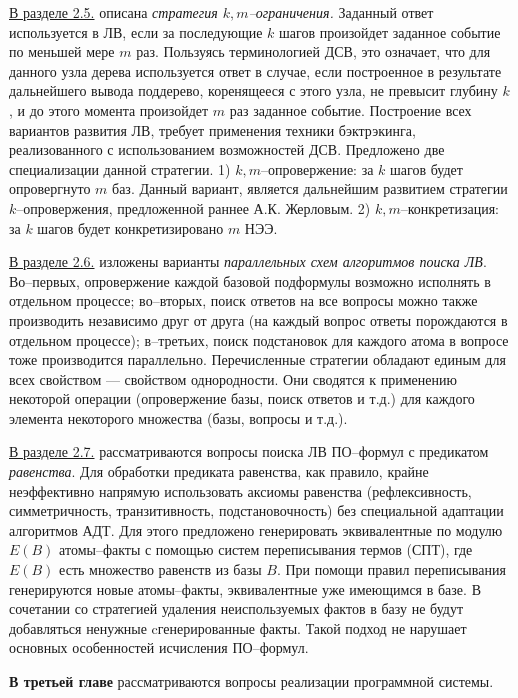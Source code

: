 \documentclass[a4paper]{report}
\begin{document}
\underline{В разделе 2.5.} описана \emph{стратегия $k,m$--ограничения.} Заданный ответ используется в ЛВ, если за последующие $k$ шагов произойдет заданное событие по меньшей мере $m$ раз. Пользуясь терминологией ДСВ, это означает, что для данного узла дерева используется ответ в случае, если построенное в результате дальнейшего вывода поддерево, коренящееся с этого узла, не превысит глубину $k$, и до этого момента произойдет $m$ раз заданное событие. Построение всех вариантов развития ЛВ, требует применения техники бэктрэкинга, реализованного с использованием возможностей ДСВ. Предложено две специализации данной стратегии. 1)  $k,m$--опровержение: за $k$ шагов будет опровергнуто $m$ баз. Данный вариант, является дальнейшим развитием стратегии $k$--опровержения, предложенной раннее А.К. Жерловым.  2) $k,m$--конкретизация: за $k$ шагов будет конкретизировано $m$ НЭЭ.

\underline{В разделе 2.6.} изложены варианты \emph{параллельных схем алгоритмов поиска ЛВ}. Во--первых, опровержение каждой базовой подформулы возможно исполнять в отдельном процессе; во--вторых, поиск ответов на все вопросы можно также производить независимо друг от друга (на каждый вопрос ответы порождаются в отдельном процессе); в--третьих, поиск подстановок для каждого атома в вопросе тоже производится параллельно. Перечисленные стратегии обладают единым для всех свойством --- свойством однородности. Они сводятся к применению некоторой операции (опровержение базы, поиск ответов и т.д.) для каждого элемента некоторого множества (базы, вопросы и т.д.).

\underline{В разделе 2.7.} рассматриваются вопросы поиска ЛВ ПО--формул с предикатом \emph{равенства}. Для обработки предиката равенства, как правило, крайне неэффективно напрямую использовать аксиомы равенства (рефлексивность, симметричность, транзитивность, подстановочность) без специальной адаптации алгоритмов АДТ. Для этого предложено генерировать эквивалентные по модулю $E(B)$ атомы--факты с помощью систем переписывания термов (СПТ), где $E(B)$ есть множество равенств из базы $B$. При помощи правил переписывания генерируются новые атомы--факты, эквивалентные уже имеющимся в базе. В сочетании со стратегией удаления неиспользуемых фактов в базу не будут добавляться ненужные cгенерированные факты. Такой подход не нарушает основных особенностей исчисления ПО--формул.


\textbf{В третьей главе} рассматриваются вопросы реализации программной системы.
\end{document}
